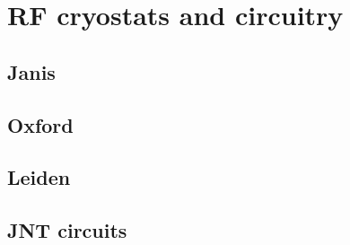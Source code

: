 \chapter{RF cryostats and circuitry}
\label{ch:RF_cryostats_and_circuitry}

\section{Janis}

\section{Oxford}

\section{Leiden}

\section{JNT circuits}